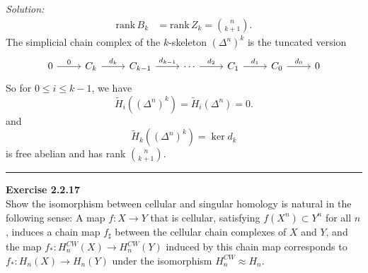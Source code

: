 \documentclass[a4paper, 12pt]{article}
\newenvironment{problem}[2][Exercise]
    { \begin{mdframed}[backgroundcolor=gray!20] \textbf{#1 #2} \\}
    {  \end{mdframed}}
\newenvironment{solution}
    {\textit{Solution:}}
    {}
\newcommand{\rank}{\text{rank}\,}
\begin{document}
\begin{solution}
\begin{align*}
    \rank B_k&=\rank Z_k=\binom{n}{k+1}.
\end{align*}
The simplicial chain complex of the \(k\)-skeleton \((\Delta^n)^k\) is the tuncated version 
\[\begin{tikzcd}
	0 & {C_k} & {C_{k-1}} & \cdots & {C_1} & {C_0} & 0
	\arrow["0", from=1-1, to=1-2]
	\arrow["{d_k}", from=1-2, to=1-3]
	\arrow["{d_{k-1}}", from=1-3, to=1-4]
	\arrow["{d_2}", from=1-4, to=1-5]
	\arrow["{d_1}", from=1-5, to=1-6]
	\arrow["{d_0}", from=1-6, to=1-7]
\end{tikzcd}\]
So for \(0\leq i\leq k-1\), we have 
\[\tilde{H}_i((\Delta^n)^k)=\tilde{H}_i(\Delta^n)=0.\]
and 
\[\tilde{H}_k((\Delta^n)^k)=\ker d_k\]
is free abelian and has rank \(\binom{n}{k+1}\).
\end{solution}

\noindent\rule{7in}{2.8pt}
\begin{problem}{2.2.17}
Show the isomorphism between cellular and singular homology is natural in the following sense: A map \(f:X\rightarrow Y\) that is cellular, satisfying \(f(X^n)\subset Y^n\) for all \(n\), induces a chain 
map \(f_\sharp\) between the cellular chain complexes of \(X\) and \(Y\), and the map \(f_*:H_n^{CW}(X)\rightarrow H_n^{CW}(Y)\) induced by this chain map corresponds to \(f_*:H_n(X)\rightarrow H_n(Y)\) under the 
isomorphism \(H_n^{CW}\approx H_n\).
\end{problem}
\end{document}
